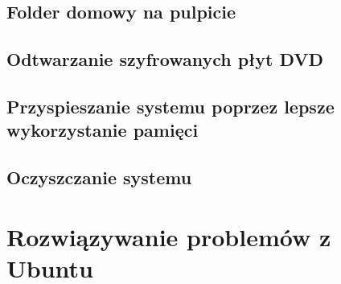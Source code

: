 \documentclass[a4paper,11pt,oneside]{mwart}
\begin{document}
		\subsection{Folder domowy na pulpicie}
			
		\subsection{Odtwarzanie szyfrowanych płyt DVD}
			
		\subsection{Przyspieszanie systemu poprzez lepsze wykorzystanie pamięci}
			
		\subsection{Oczyszczanie systemu}
			
	\section{Rozwiązywanie problemów z Ubuntu}
\end{document}
